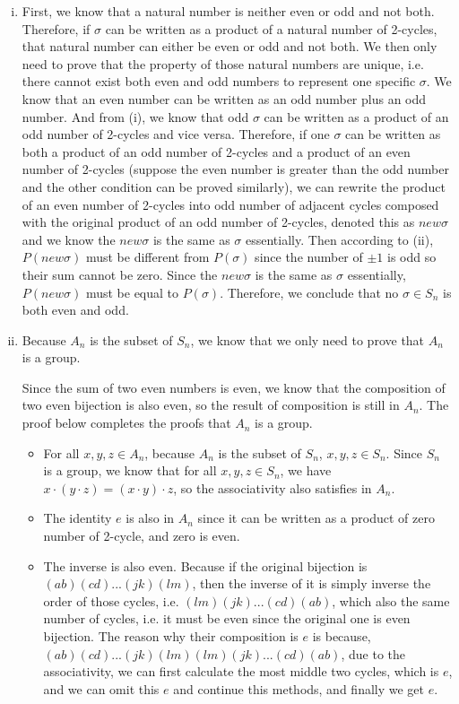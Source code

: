 \documentclass{article}[12pt]
\begin{document}
\begin{enumerate}[(i)]
\item First, we know that a natural number is neither even or odd and not both. Therefore, if $\sigma$ can be written as a product of a natural number of 2-cycles, that natural number can either be even or odd and not both. We then only need to prove that the property of those natural numbers are unique, i.e. there cannot exist both even and odd numbers to represent one specific $\sigma$. We know that an even number can be written as an odd number plus an odd number. And from (i), we know that odd $\sigma$ can be written as a product of an odd number of 2-cycles and vice versa. Therefore, if one $\sigma$ can be written as both a product of an odd number of 2-cycles and a product of an even number of 2-cycles (suppose the even number is greater than the odd number and the other condition can be proved similarly), we can rewrite the product of an even number of 2-cycles into odd number of adjacent cycles composed with the original product of an odd number of 2-cycles, denoted this as $new\sigma$ and we know the $new\sigma$ is the same as $\sigma$ essentially. Then according to (ii), $P(new\sigma)$ must be different from $P(\sigma)$ since the number of $\pm 1$ is odd so their sum cannot be zero. Since the $new\sigma$ is the same as $\sigma$ essentially, $P(new\sigma)$ must be equal to $P(\sigma)$. Therefore, we conclude that no $\sigma \in S_{n}$ is both even and odd.
\item Because $A_n$ is the subset of $S_n$, we know that we only need to prove that $A_n$ is a group. 
\par Since the sum of two even numbers is even, we know that the composition of two even bijection is also even, so the result of composition is still in $A_n$. The proof below completes the proofs that $A_n$ is a group. 
\begin{itemize}
\item For all $x,y,z\in A_n$, because $A_n$ is the subset of $S_n$, $x,y,z\in S_n$. Since $S_n$ is a group, we know that for all $x,y,z\in S_n$, we have $x\cdot (y\cdot z)=(x\cdot y)\cdot z$, so the associativity also satisfies in $A_n$.
\item The identity $e$ is also in $A_n$ since it can be written as a product of zero number of 2-cycle, and zero is even.
\item The inverse is also even. Because if the original bijection is $(ab)(cd)...(jk)(lm)$, then the inverse of it is simply inverse the order of those cycles, i.e. $(lm)(jk)...(cd)(ab)$, which also the same number of cycles, i.e. it must be even since the original one is even bijection. The reason why their composition is $e$ is because, $(ab)(cd)...(jk)(lm)(lm)(jk)...(cd)(ab)$, due to the associativity, we can first calculate the most middle two cycles, which is $e$, and we can omit this $e$ and continue this methods, and finally we get $e$.

\end{itemize}
\end{enumerate}
\end{document}
